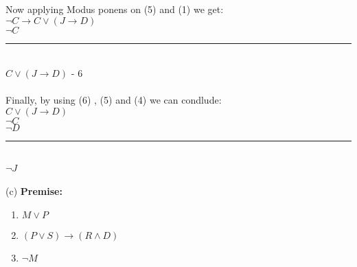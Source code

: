 \documentclass{article}
\begin{document}
Now applying Modus ponens on (5) and (1) we get: \\
$\neg C \rightarrow C \vee (J \rightarrow D)$ \\
$ \neg C $ \\
\noindent\rule{1.9cm}{0.4pt}\\
$ C \vee (J \rightarrow D)$ - 6 \\
\\
Finally, by using (6) , (5) and (4) we can condlude: \\
$ C \vee (J \rightarrow D)$ \\
$ \neg C $ \\
$\neg D$ \\
\noindent\rule{1.9cm}{0.4pt}\\
$ \neg J $ \\
\\
(c)  \textbf{Premise:} 
\begin{enumerate}
    \item $ M \vee P $
    \item $(P \vee S) \rightarrow (R \wedge D) $
    \item $\neg M $
\end{enumerate} 
\end{document}
